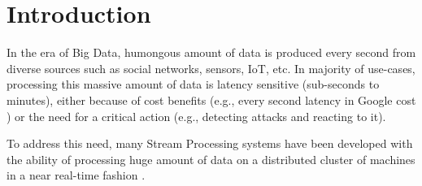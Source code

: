 \section{Introduction}
\label{sec:intro}

In the era of Big Data, humongous amount of data is produced every second from diverse sources such as social networks, sensors, IoT, etc. In majority of use-cases, processing this massive amount of data  is latency sensitive (sub-seconds to minutes), either because of  cost benefits (e.g., every second latency in Google cost ) or the need for a critical action (e.g., detecting attacks and reacting to it).

To address this need, many Stream Processing systems have been developed with the ability of processing huge amount of data on a distributed cluster of machines in a near real-time fashion .  




\begin{table}[h]
\end{table}



